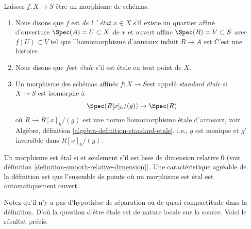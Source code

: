 \begin{definition}

\label{definition-etale}

Laisser $f : X \to S$ être un morphisme de schémas.

\begin{enumerate}

\item Nous disons que $f$ est {\it  \'de l ' état $x \in X$} s'il existe un quartier affiné d'ouverture $\Spec(A) = U \subset X$
de $x$ et ouvert affine $\Spec(R) = V \subset S$
avec $f(U) \subset V$ tel que l'homomorphisme d'anneaux induit
$R \to A$ est \'C'est une histoire.
\item Nous disons que $f$est {\it \'etale} s'il est étale en tout point de $X$.
\item Un morphisme des schémas affinés $f : X \to S$est appelé {\it standard \'etale} si $X \to S$ est isomorphe à
$$
\Spec(R[x]_h/(g)) \to \Spec(R)
$$
où $R \to R[x]_h/(g)$ est une norme \'homomorphisme étale d'anneaux, voir Algèbre, définition \ref{algebra-definition-standard-etale}, i.e., $g$ est monique et $g'$ inversible dans $R[x]_h/(g)$.

\end{enumerate}

\end{definition}

\noindent
Un morphisme est \'etal si et seulement s'il est lisse de dimension relative $0$ (voir définition \ref{definition-smooth-relative-dimension}). Une caractéristique agréable de la définition est que l'ensemble de points où un morphisme est \'etal est automatiquement ouvert.

\medskip\noindent
Notez qu'il n'y a pas d'hypothèse de séparation ou de quasi-compactitude dans la définition. D'où la question d'être \'etale est de nature locale sur la source. Voici le résultat précis.

